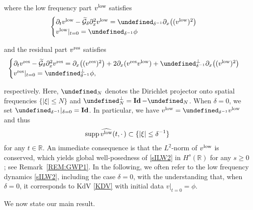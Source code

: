 \documentclass[letterpaper, 11pt,  reqno]{amsart}
\DeclareMathOperator*{\supp}{supp}
\DeclareMathOperator{\Id}{{\bf Id}}
\newcommand{\1}{\hspace{0.5mm}\textup{I}\hspace{0.5mm}}
\newcommand{\noi}{\noindent}
\newcommand{\R}{\mathbb{R}}
\let\P= \undefined
\newcommand{\P}{\mathbf{P}}
\newcommand{\low}{\textup{low}}
\newcommand{\high}{\textup{res}}
\newcommand{\dl}{\delta}
\newcommand{\ft}{\widehat}
\newcommand{\wt}{\widetilde}
\newcommand{\dx}{\partial_x}
\newcommand{\dt}{\partial_t}
\newcommand{\Gd}{\wt{\mathcal{G}}_\dl}
\newcommand{\ind}{\mathbf 1}
\numberwithin{equation}{section}
\numberwithin{theorem}{section}
\begin{document}
\noi
where 
the low frequency part $v^\low$ satisfies
\begin{align}
\begin{cases}
\dt v^\low   -     \Gd   \dx^2 v^\low= \P_{ \dl^{-1}} \dx\big((v^\low)^2\big)\\
v^\low|_{t = 0} = \P_{ \dl^{-1}} \phi
\end{cases}
\label{sILW2}
\end{align}

\noi
and
the residual part $v^\high$ satisfies
\begin{align}
\begin{cases}
\dt v^\high   -     \Gd   \dx^2 v^\high= \dx\big((v^\high)^2\big)
+ 2\dx(v^\high v^\low)
+  \P_{ \dl^{-1}}^\perp \dx\big((v^\low)^2\big)\\
v^\high|_{t = 0} = \P_{ \dl^{-1}}^\perp \phi, 
\end{cases}
\label{sILW3}
\end{align}

\noi
respectively.
Here, $\P_{N}$ denotes the Dirichlet projector onto spatial frequencies $\{|\xi|\leq N\}$
 and $\P_{N}^\perp = \Id - \P_{N}$. 
 When $\dl = 0$, 
we set $\P_{\dl^{-1}}|_{\dl = 0} = \Id$.
 In particular, 
 we have \(v^\low = \P_{\dl^{-1}}v^\low\) and thus 
\begin{align}
\supp \ft {v^\low}(t, \cdot\,) \subset \{|\xi|\le  \dl^{-1}\}
\label{low1}
\end{align}
for any $t \in \R$.
An immediate consequence is that the \(L^2\)-norm of \(v^\low\) is conserved, which yields global well-posedness of \eqref{sILW2} in $H^s(\R)$ for any $s\geq 0$; see Remark~\ref{REM:GWP1}.
In the following, 
we often refer to the low frequency dynamics \eqref{sILW2}, 
including the case $\dl = 0$, 
with the understanding that, 
when $\dl = 0$,  
it corresponds to KdV \eqref{KDV}
with initial data $v|_{t= 0} = \phi$.





We now state our main result.
\end{document}
